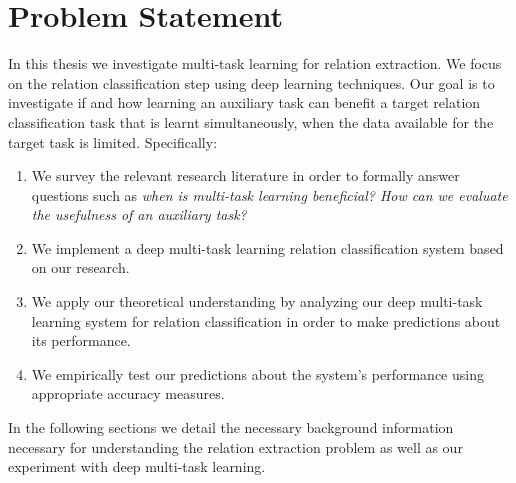 \section{Problem Statement}
In this thesis we investigate multi-task learning for relation extraction. We focus on the relation classification step using deep learning techniques. Our goal is to investigate if and how learning an auxiliary task can benefit a target relation classification task that is learnt simultaneously, when the data available for the target task is limited. Specifically:
\begin{enumerate}
	\item We survey the relevant research literature in order to formally answer questions such as \textit{when is multi-task learning beneficial? How can we evaluate the usefulness of an auxiliary task?}
	\item We implement a deep multi-task learning relation classification system based on our research.
	\item We apply our theoretical understanding by analyzing our deep multi-task learning system for relation classification in order to make predictions about its performance.
	\item We empirically test our predictions about the system's performance using appropriate accuracy measures.
\end{enumerate}
In the following sections we detail the necessary background information necessary for understanding the relation extraction problem as well as our experiment with deep multi-task learning.